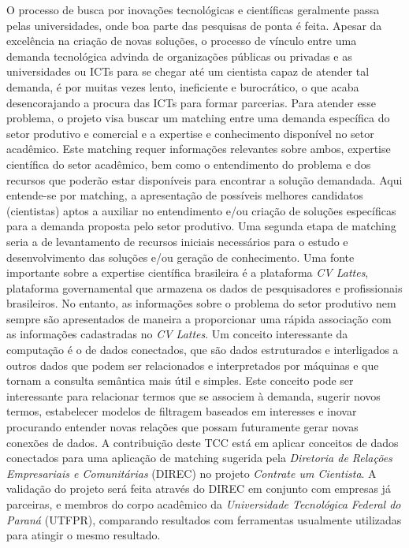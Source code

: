 \begin{resumoutfpr}
    O processo de busca por inovações tecnológicas e científicas geralmente passa pelas universidades, onde boa parte das pesquisas de ponta é feita. Apesar da excelência na criação de novas soluções, o processo de vínculo entre uma demanda tecnológica advinda de organizações públicas ou privadas e as universidades ou ICTs para se chegar até um cientista capaz de atender tal demanda, é por muitas vezes lento, ineficiente e burocrático, o que acaba desencorajando a procura das ICTs para formar parcerias. Para atender esse problema, o projeto visa buscar um matching entre uma demanda específica do setor produtivo e comercial e a expertise e conhecimento disponível no setor acadêmico. Este matching requer informações relevantes sobre ambos, expertise científica do setor acadêmico, bem como o entendimento do problema e dos recursos que poderão estar disponíveis para encontrar a solução demandada. Aqui entende-se por matching, a apresentação de possíveis melhores candidatos (cientistas) aptos a auxiliar no entendimento e/ou criação de soluções específicas para a demanda proposta pelo setor produtivo. Uma segunda etapa de matching seria a de levantamento de recursos iniciais necessários para o estudo e desenvolvimento das soluções e/ou geração de conhecimento. Uma fonte importante sobre a expertise científica brasileira é a plataforma \emph{CV Lattes}, plataforma governamental que armazena os dados de pesquisadores e profissionais brasileiros. No entanto, as informações sobre o problema do setor produtivo nem sempre são apresentados de maneira a proporcionar uma rápida associação com as informações cadastradas no \emph{CV Lattes}.
    Um conceito interessante da computação é o de dados conectados, que são dados estruturados e interligados a outros dados que podem ser relacionados e interpretados por máquinas e que tornam a consulta semântica mais útil e simples. Este conceito pode ser interessante para relacionar termos que se associem à demanda, sugerir novos termos, estabelecer modelos de filtragem baseados em interesses e inovar procurando entender novas relações que possam futuramente gerar novas conexões de dados. A contribuição deste TCC está em aplicar conceitos de dados conectados para uma aplicação de matching sugerida pela \emph{Diretoria de Relações Empresariais e Comunitárias} (DIREC) no projeto \emph{Contrate um Cientista}. A validação do projeto será feita através do DIREC em conjunto com empresas já parceiras, e membros do corpo acadêmico da \emph{Universidade Tecnológica Federal do Paraná} (UTFPR), comparando resultados com ferramentas usualmente utilizadas para atingir o mesmo resultado.
\end{resumoutfpr}